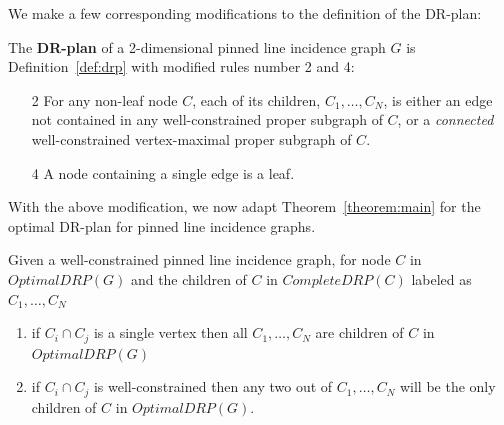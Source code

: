 We make  a few corresponding modifications to the definition of the DR-plan:


\begin{definition}

 The \textbf{DR-plan} of  a 2-dimensional pinned line incidence graph $G$ is Definition~\ref{def:drp} with  modified rules number 2 and 4:
    \begin{enumerate}
        \item[2] For any non-leaf node $C$, each of its children, $C_1,\ldots,C_N$, is either an edge not contained in any well-constrained proper subgraph of $C$, or a {\em connected} well-constrained vertex-maximal proper subgraph of  $C$.
        \item[4] A node containing a single edge is a leaf.
    \end{enumerate}
\end{definition}


With the above modification,
we now adapt Theorem~\ref{theorem:main} 
for the optimal DR-plan for  pinned line incidence graphs.


\begin{corollary}
Given a well-constrained  pinned line incidence graph, for node $C$ in $OptimalDRP(G)$ and the children of $C$ in $CompleteDRP(C)$ labeled as $C_1,\ldots,C_N$
\begin{enumerate}
    \item if $C_i \cap C_j$ is a single vertex then all $C_1,\ldots,C_N$ are children of $C$ in $OptimalDRP(G)$
    \item if $C_i \cap C_j$ is well-constrained then any two out of $C_1,\ldots,C_N$ will be the only children of $C$ in $OptimalDRP(G)$.
\end{enumerate}
\label{cor:pinned}
\end{corollary}

